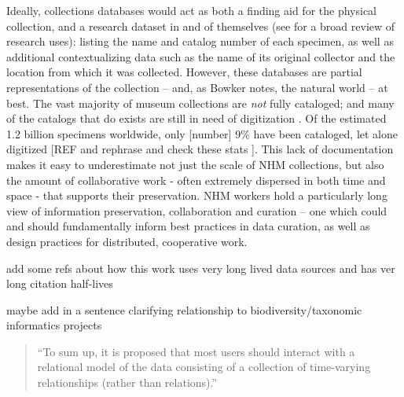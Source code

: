 Ideally, collections databases would act as both a finding aid for the physical collection, and a research dataset in and of themselves (see \cite{Chapman2005} for a broad review of research uses): listing the name and catalog number of each specimen, as well as additional contextualizing data such as the name of its original collector and the location from which it was collected. However, these databases are partial representations of the collection -- and, as Bowker notes, the natural world \cite{Bowker_2000} -- at best. The vast majority of museum collections are \textit{not} fully cataloged; and many of the catalogs that do exists are still in need of digitization \cite{Beaman_2012}. Of the estimated 1.2 billion specimens worldwide, only [number] 9\% have been cataloged, let alone digitized [REF and rephrase and check these stats \cite{Ari_o_2010}]. This lack of documentation makes it easy to underestimate not just the scale of NHM collections, but also the amount of collaborative work  - often extremely dispersed in both time and space - that supports their preservation. NHM workers hold a particularly long view of information preservation, collaboration and curation -- one which could and should fundamentally inform best practices in data curation, as well as design practices for distributed, cooperative work.

add some refs about how this work uses very long lived data sources and has ver long citation half-lives

maybe add in a sentence clarifying relationship to biodiversity/taxonomic informatics projects

\begin{quote}
“To sum up, it is proposed that most users should interact with a relational model of the data consisting of a collection of time-varying relationships (rather than relations).”
\end{quote}